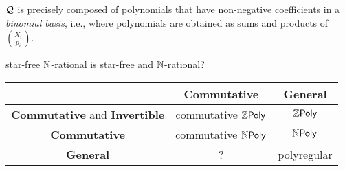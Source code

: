 \documentclass[a4paper,11pt]{article}
\begin{document}
\begin{conjecture}
    $\mathcal{Q}$ is precisely composed of polynomials that
    have non-negative coefficients in a \emph{binomial basis},
    i.e., where polynomials are obtained
    as sums and products of $\binom{X_i}{p_i}$.
\end{conjecture}

\begin{conjecture}
    star-free $\mathbb{N}$-rational is star-free and $\mathbb{N}$-rational?
\end{conjecture}


\begin{center}
    \begin{tabular}{c|cc}
        \toprule
        & \textbf{Commutative} & \textbf{General} \\
        \midrule
        \textbf{Commutative}
        and \textbf{Invertible} & commutative $\ZPoly$ & $\ZPoly$ \\
        \textbf{Commutative} & commutative $\NPoly$ & $\NPoly$ \\
        \textbf{General} & ? & polyregular 
    \end{tabular}
\end{center}


\printbibliography

\appendix
\end{document}
